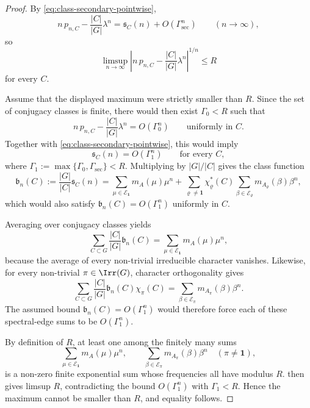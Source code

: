 \begin{proof}

  By \eqref{eq:class-secondary-pointwise},
  \[
    n\,p_{n,C}-\frac{|C|}{|G|}\lambda^n
    =
    \mathfrak s_C(n)+O(\Gamma_{\mathrm{sec}}^n)
    \qquad (n\to\infty),
  \]
  so
  \[
    \limsup_{n\to\infty}
      \left|
        n\,p_{n,C}-\frac{|C|}{|G|}\lambda^n
      \right|^{1/n}
    \le R
  \]
  for every \(C\).

  Assume that the displayed maximum were strictly smaller than \(R\).
  Since the set of conjugacy classes is finite, there would then exist
  \(\Gamma_0<R\) such that
  \[
    n\,p_{n,C}-\frac{|C|}{|G|}\lambda^n
    =O(\Gamma_0^n)
    \qquad\text{uniformly in } C.
  \]
  Together with \eqref{eq:class-secondary-pointwise}, this would imply
  \[
    \mathfrak s_C(n)=O(\Gamma_1^n)
    \qquad\text{for every } C,
  \]
  where \(\Gamma_1:=\max\{\Gamma_0,\Gamma_{\mathrm{sec}}\}<R\).
  Multiplying by \(|G|/|C|\) gives the class function
  \[
    \mathfrak b_n(C)
    :=
    \frac{|G|}{|C|}\mathfrak s_C(n)
    =
    \sum_{\mu\in\mathcal E_{\mathbf 1}}m_A(\mu)\mu^n
    +
    \sum_{\varrho\neq\mathbf 1}\chi_\varrho^\ast(C)
      \sum_{\beta\in\mathcal E_\varrho}m_{A_\varrho}(\beta)\beta^n,
  \]
  which would also satisfy \(\mathfrak b_n(C)=O(\Gamma_1^n)\)
  uniformly in \(C\).

  Averaging over conjugacy classes yields
  \[
    \sum_{C\subset G}\frac{|C|}{|G|}\mathfrak b_n(C)
    =
    \sum_{\mu\in\mathcal E_{\mathbf 1}}m_A(\mu)\mu^n,
  \]
  because the average of every non-trivial irreducible character
  vanishes. Likewise, for every non-trivial \(\pi\in\Irr(G)\),
  character orthogonality gives
  \[
    \sum_{C\subset G}\frac{|C|}{|G|}\mathfrak b_n(C)\chi_\pi(C)
    =
    \sum_{\beta\in\mathcal E_\pi}m_{A_\pi}(\beta)\beta^n.
  \]
  The assumed bound \(\mathfrak b_n(C)=O(\Gamma_1^n)\) would therefore
  force each of these spectral-edge sums to be \(O(\Gamma_1^n)\).

  By definition of \(R\), at least one among the finitely many sums
  \[
    \sum_{\mu\in\mathcal E_{\mathbf 1}}m_A(\mu)\mu^n,
    \qquad
    \sum_{\beta\in\mathcal E_\pi}m_{A_\pi}(\beta)\beta^n
    \quad (\pi\neq\mathbf 1),
  \]
  is a non-zero finite exponential sum whose frequencies all have
  modulus \(R\).  then
  gives limsup \(R\), contradicting the bound \(O(\Gamma_1^n)\) with
  \(\Gamma_1<R\). Hence the maximum cannot be smaller than \(R\), and
  equality follows.
\end{proof}

